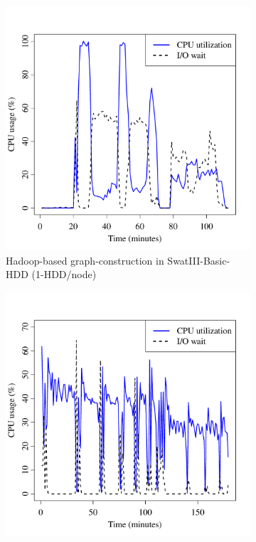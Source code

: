 \documentclass[10pt, conference, compsocconf]{IEEEtran}
\begin{document}
\begin{figure}[htb]
        \begin{subfigure}[b]{0.23\textwidth}
                \includegraphics[width=\textwidth]{Figure/SystemData/Plots/BGCPUHDD.pdf}
                \caption{Hadoop-based graph-construction in SwatIII-Basic-HDD (1-HDD/node)}
                \label{fig:BGCPUHDD}
        \end{subfigure}
		\begin{subfigure}[b]{0.23\textwidth}
                \includegraphics[width=\textwidth]{Figure/SystemData/Plots/ECCPUHDD.pdf}

\end{subfigure}
\end{figure}
\end{document}
